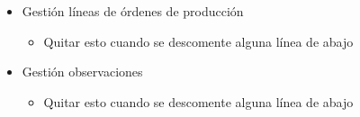 \begin{itemize}
\begin{itemize}
		\end{itemize}
		\item Gestión líneas de órdenes de producción
		\begin{itemize}
			\item Quitar esto cuando se descomente alguna línea de abajo
			
		\end{itemize}
		\item Gestión observaciones
		\begin{itemize}
			\item Quitar esto cuando se descomente alguna línea de abajo
		\end{itemize}
	\end{itemize}	

